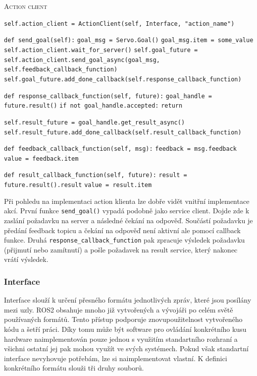 \begin{algorithm}[h!]
	\label{}
	\caption{\textsc{Action client}}
	
	\DontPrintSemicolon
	\SetAlgoNoLine
	\SetNlSty{}{}{:}
	\SetNlSkip{-1.1em}
	
	\BlankLine \Indp\Indpp
	
 	\texttt{self.action\_client = ActionClient(self, Interface, "action\_name")}\;
 	
 	\BlankLine
 	\texttt{def send\_goal(self):}\;
 	\Indp\Indp
 	\texttt{goal\_msg = Servo.Goal()}\;
 	\texttt{goal\_msg.item = some\_value}\;
 	\texttt{self.action\_client.wait\_for\_server()}\;
 	\texttt{self.goal\_future = self.action\_client.send\_goal\_async(goal\_msg, self.feedback\_callback\_function)}\;
 	\texttt{self.goal\_future.add\_done\_callback(self.response\_callback\_function)}\;
	\Indm\Indm

	\BlankLine
	\tcp{reakce na přijmutí nebo zamítnutí požadavku}
 	\texttt{def response\_callback\_function(self, future):}\;
 	\Indp\Indp
 	\texttt{goal\_handle = future.result()}\;
 	\texttt{if not goal\_handle.accepted:}\;
 	\Indp\Indp
 	\texttt{return}\;
	\Indm\Indm
	
	\BlankLine
 	\texttt{self.result\_future = goal\_handle.get\_result\_async()}\;
 	\texttt{self.result\_future.add\_done\_callback(self.result\_callback\_function)}\;
	\Indm\Indm

 	\BlankLine
 	\texttt{def feedback\_callback\_function(self, msg):}\;
 	\Indp\Indp
 	\texttt{feedback = msg.feedback}\;
 	\texttt{value = feedback.item}\;
	\Indm\Indm

	\BlankLine
 	\texttt{def result\_callback\_function(self, future):}\;
 	\Indp\Indp
    \texttt{result = future.result().result}\;
    \texttt{value = result.item}\;
    
\end{algorithm}
Při pohledu na implementaci action klienta lze dobře vidět vnitřní implementace akcí. První funkce \verb|send_goal()| vypadá podobně jako service client. Dojde zde k zaslání požadavku na server a následné čekání na odpověď. Součástí požadavku je předání feedback topicu a čekání na odpověď není aktivní ale pomocí callback funkce. Druhá \verb|response_callback_function| pak zpracuje výsledek požadavku (přijmutí nebo zamítnutí) a pošle požadavek na result service, který nakonec vrátí výsledek.

\subsubsection*{Interface}
Interface slouží k určení přesného formátu jednotlivých zpráv, které jsou posílány mezi uzly. ROS2 obsahuje mnoho již vytvořených a vývojáři po celém světě používaných formátů. Tento přístup podporuje znovupoužitelnost vytvořeného kódu a šetří práci. Díky tomu může být software pro ovládání konkrétního kusu hardware naimplementován pouze jednou s využitím standartního rozhraní a všichni ostatní jej pak mohou využít ve svých systémech.
Pokud však standartní interface nevyhovuje potřebám, lze si naimplementovat vlastní. K definici konkrétního formátu slouži tři druhy souborů. 

